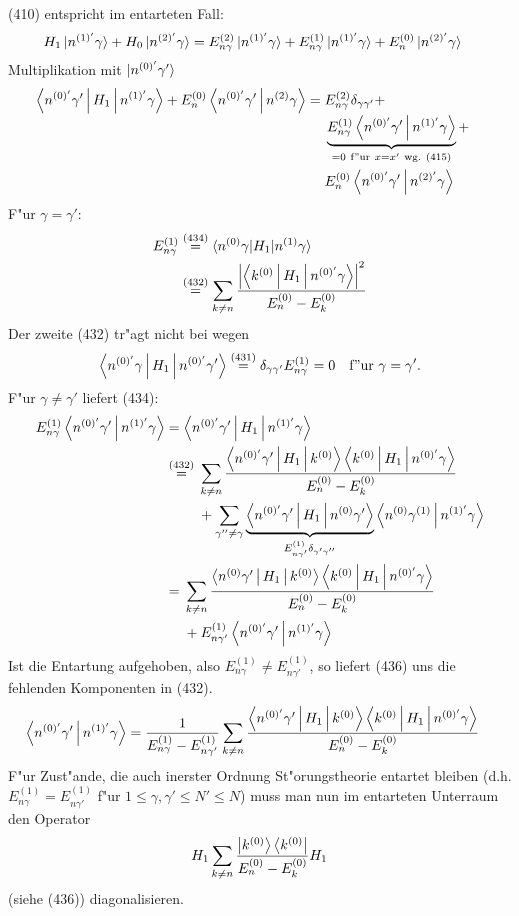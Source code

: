 \documentclass[a4paper]{scrartcl}
\newcommand{\eqn}[1]{\begin{align} #1 \end{align}}
\newcommand{\spl}[1]{\begin{split} #1 \end{split}}
\begin{document}
(410) entspricht im entarteten Fall:
\eqn{ H_1 \ket{n^{(1)'} \gamma} + H_0 \ket{ n^{(2)'} \gamma} & = E_{n\gamma}^{(2)} \ket{ n^{(1)'} \gamma} + E_{n \gamma}^{(1)} \ket{ n^{(1)'} \gamma} + E_n^{(0)} \ket{n^{(2)'} \gamma}}
Multiplikation mit $\ket{ n^{(0)'} \gamma'}$
\eqn{ \Braket{ n^{(0)'} \gamma' |  H_1 | n^{(1)'} \gamma} + E_n^{(0)} \Braket{ n^{(0)'} \gamma' | n^{(2)} \gamma} & = 
\begin{aligned}[t]
& E_{n \gamma}^{(2)} \delta_{\gamma \gamma'} + \\
& \underbrace{ E_{n\gamma}^{(1)} \Braket{ n^{(0)'} \gamma' | n^{(1)'} \gamma}}_{=0 \ \mathrm{f"ur \ } x=x' \mathrm{ \ wg.\ (415)}} + \\ 
& E_n^{(0)} \Braket{ n^{(0)'} \gamma' | n^{(2)'} \gamma}
\end{aligned}}
F"ur $\gamma = \gamma'$:
\eqn{ \spl{
E_{n \gamma}^{(1)} & \stackrel{(434)}= \braket{ n^{(0)} \gamma | H_1 | n^{(1)} \gamma} \\
& \stackrel{(432)}= \sum_{k \neq n} \frac{ \left\vert \Braket{ k^{(0)} | H_1 | n^{(0)'} \gamma} \right\vert^2 }{E_n^{(0)} - E_k^{(0)}}
}}
Der zweite (432) tr"agt nicht bei wegen
$$\Braket{ n^{(0)'} \gamma | H_1 | n^{(0)'} \gamma' } \stackrel{(431)}= \delta_{\gamma \gamma'} E_{n \gamma}^{(1)} = 0 \quad \mathrm{ f"ur \ } \gamma = \gamma'.$$
F"ur $\gamma \neq \gamma'$ liefert (434):
\eqn{ \spl{
E_{n\gamma}^{(1)} \Braket{ n^{(0)'} \gamma' | n^{(1)'} \gamma} & = \Braket{ n^{(0)'} \gamma' | H_1 | n^{(1)'} \gamma} \\
& \stackrel{(432)} = 
\begin{aligned}[t]
& \sum_{k \neq n} \frac{ \Braket{ n^{(0)'} \gamma' | H_1 | k^{(0)}} \Braket{ k^{(0)} | H_1 | n^{(0)'} \gamma}}{E_n^{(0)} - E_k^{(0)}} \\
& + \sum_{\gamma'' \neq \gamma} \underbrace{ \Braket{ n^{(0)'} \gamma' | H_1 | n^{(0)} \gamma'}}_{E_{n \gamma'}^{(1)} \delta_{\gamma' \gamma''}} \Braket{ n^{(0)} \gamma^{(1)} | n^{(1)'} \gamma} 
\end{aligned} \\
& = 
\begin{aligned}[t]
& \sum_{k \neq n} \frac{ \Braket{ n^{(0)} \gamma' | H_1 | k^{(0)}} \Braket{ k^{(0)} | H_1 | n^{(0)'} \gamma}}{E_n^{(0)} - E_k^{(0)}} \\
& + E_{n \gamma'}^{(1)} \Braket{ n^{(0)'} \gamma' | n^{(1)'} \gamma}
\end{aligned}
}}
Ist die Entartung aufgehoben, also $E_{n\gamma}^{(1)} \neq E_{n \gamma'}^{(1)}$, so liefert (436) uns die fehlenden Komponenten in (432).
\eqn{ \Braket{n^{(0)'} \gamma' | n^{(1)'} \gamma}& = \frac1{E_{n\gamma}^{(1)} - E_{n \gamma'}^{(1)}} \sum_{k \neq n} \frac{ \Braket{ n^{(0)'} \gamma' | H_1 | k^{(0)}} \Braket{ k^{(0)} | H_1 | n^{(0)'} \gamma}}{E_n^{(0)} - E_k^{(0)}}}
F"ur Zust"ande, die auch inerster Ordnung St"orungstheorie entartet bleiben (d.h. $E_{n\gamma}^{(1)} = E_{n \gamma'}^{(1)}$ f"ur $1 \leq \gamma, \gamma' \leq N' \leq N$) muss man nun im entarteten Unterraum den Operator
\eqn{H_1 \sum_{k \neq n} \frac{ \Ket{ k^{(0)} } \Bra{ k^{(0)}}}{E_n^{(0)} - E_k^{(0)}} H_1}
(siehe (436)) diagonalisieren.
\end{document}
